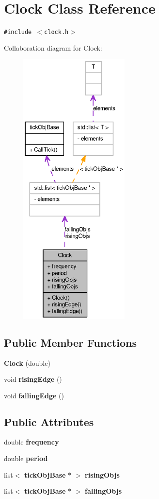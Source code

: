 \section{Clock Class Reference}
\label{classClock}
{\tt \#include $<$clock.h$>$}

Collaboration diagram for Clock:\nopagebreak
\begin{figure}[H]
\begin{center}
\leavevmode
\includegraphics[height=400pt]{classClock__coll__graph}
\end{center}
\end{figure}
\subsection*{Public Member Functions}
\begin{CompactItemize}
\item 
{\bf Clock} (double)
\item 
void {\bf risingEdge} ()
\item 
void {\bf fallingEdge} ()
\end{CompactItemize}
\subsection*{Public Attributes}
\begin{CompactItemize}
\item 
double {\bf frequency}
\item 
double {\bf period}
\item 
list$<$ {\bf tickObjBase} $\ast$ $>$ {\bf risingObjs}
\item 
list$<$ {\bf tickObjBase} $\ast$ $>$ {\bf fallingObjs}
\end{CompactItemize}


